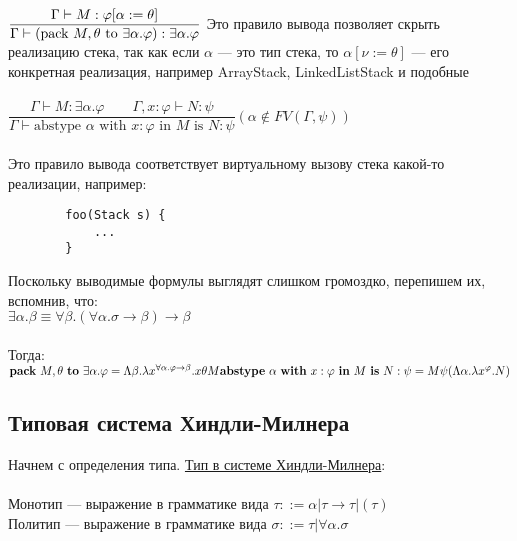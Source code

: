 	
 	$\dfrac{\Gamma \vdash M : \varphi[\alpha := \theta]}{\Gamma\vdash (\text{pack } M, \theta \text{ to } \exists \alpha . \varphi) : \exists \alpha.\varphi}\\ \\ \\
	$ Это правило вывода позволяет скрыть реализацию стека, так как если $\alpha$ --- это тип стека, то $\alpha[\nu := \theta]$ --- его конкретная реализация, например ArrayStack, LinkedListStack и подобные \\ \\
 	 $
 	\dfrac{\Gamma \vdash M : \exists \alpha . \varphi\qquad\Gamma, x : \varphi \vdash N : \psi}{\Gamma \vdash \text{abstype } \alpha \text{ with } x:\varphi \text{ in } M \text{ is } N:\psi}
	(\alpha \notin FV(\Gamma, \psi))$
	\\ \\
	Это правило вывода соответствует виртуальному вызову стека какой-то реализации, например: 
	\begin{verbatim}
		foo(Stack s) {
			...
		}
	\end{verbatim}
	Поскольку выводимые формулы выглядят слишком громоздко, перепишем их, вспомнив, что: \\
	$\exists\alpha.\beta\equiv\forall\beta.(\forall\alpha.\sigma\rightarrow\beta)\rightarrow\beta$\\\\
	Тогда: \\
	$	\text{\textbf{pack} } M, \theta \text{ \textbf{to} } \exists \alpha . \varphi =
		\Lambda \beta . \lambda x^{\forall \alpha . \varphi \to \beta} . x \theta M \\
		\text{\textbf{abstype} } \alpha \text{ \textbf{with} } x:\varphi \text{ \textbf{in} } M \text{ \textbf{is} } N:\psi =
		M \psi (\Lambda \alpha . \lambda x ^ \varphi . N)
	$
	
	 \subsection{Типовая система Хиндли-Милнера}
	   
	 Начнем с определения типа. \underline{Тип в системе Хиндли-Милнера}: \\ \\
	 Монотип --- выражение в грамматике вида $\tau::=\alpha|\tau\rightarrow\tau|(\tau)$\\
	 Политип --- выражение в грамматике вида $\sigma::=\tau|\forall\alpha.\sigma$\\
	 
